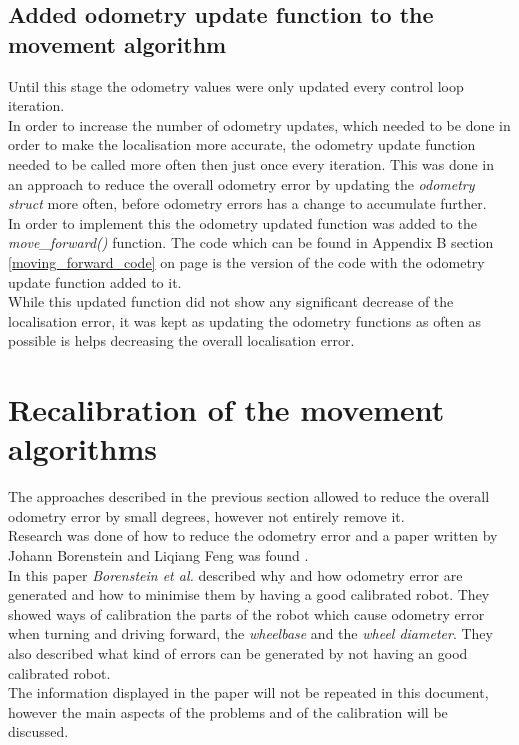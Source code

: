 \subsection{Added odometry update function to the movement algorithm}
Until this stage the odometry values were only updated every control loop iteration. \\
In order to increase the number of odometry updates, which needed to be done in order to make the localisation more accurate, the odometry update function needed to be called more often then just once every iteration.
This was done in an approach to reduce the overall odometry error  by updating the \textit{odometry struct} more often, before odometry errors has a change to accumulate further. \\[3ex]

In order to implement this the odometry updated function was added to the \textit{move\_forward()} function.
The code which can be found in Appendix B section \ref{moving_forward_code} on page \pageref{moving_forward_code} is the version of the code with the odometry update function added to it. \\
While this updated function did not show any significant decrease of the localisation error, it was kept as updating the odometry functions as often as possible is helps decreasing the overall localisation error.

\section{Recalibration of the movement algorithms}
\label{recalibration}
The approaches described in the previous section allowed to reduce the overall odometry error by small degrees, however not entirely remove it. \\
Research was done of how to reduce the odometry error and a paper written by Johann Borenstein and Liqiang Feng was found \cite{Borenstein1996Measurement}.\\

In this paper \textit{Borenstein et al.} described why and how odometry error are generated and how to minimise them by having a good calibrated robot.
They showed ways of calibration the parts of the robot which cause odometry error when turning and driving forward, the \textit{wheelbase} and the \textit{wheel diameter}.
They also described what kind of errors can be generated by not having an good calibrated robot.\\
The information displayed in the paper will not be repeated in this document, however the main aspects of the problems and of the calibration will be discussed.\\

